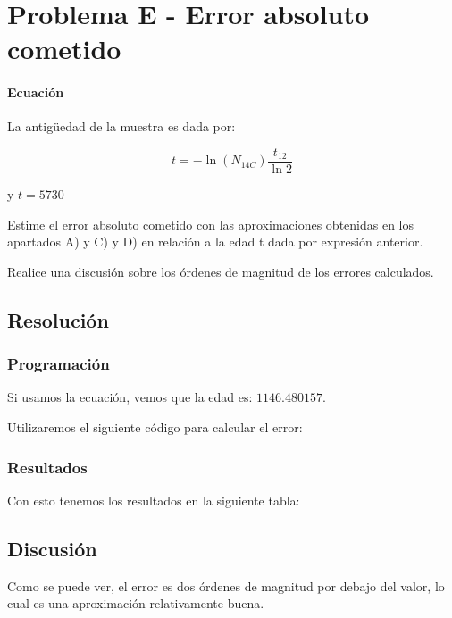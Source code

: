 \section{Problema E - Error absoluto cometido}

\paragraph{Ecuación}
La antigüedad de la muestra es dada por:

\begin{equation}
	t = - \ln (N_{14C}) \frac{t_{12}}{\ln 2}
\end{equation}

y $t = 5730$



Estime el error absoluto cometido con las aproximaciones obtenidas en los 
apartados A) y C) y D) en relación a la edad t dada por expresión anterior. 

Realice una discusión sobre los órdenes de magnitud de los errores calculados.

\subsection{Resolución}

\subsubsection{Programación}
Si usamos la ecuación, vemos que la edad es: $1146.480157$.

Utilizaremos el siguiente código para calcular el error:



\newpage 

\subsubsection{Resultados}

Con esto tenemos los resultados en la siguiente tabla:

\begin{table}[htbp]
	\centering
\end{table}

\subsection{Discusión}

Como se puede ver, el error es dos órdenes de magnitud por debajo del valor, lo cual es una aproximación relativamente buena.